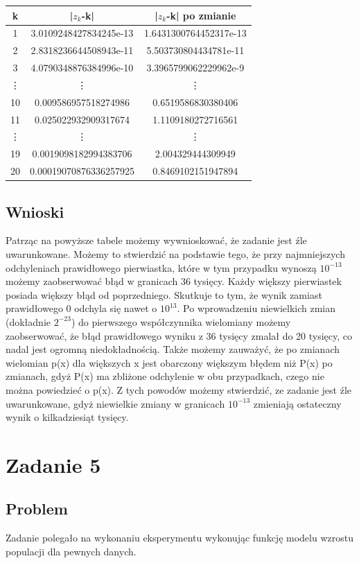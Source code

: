 \documentclass{article}
\begin{document}
\begin{center}
  \begin{tabular}{c|c|c}
    k & |$z_{k}$-k| & |$z_{k}$-k| po zmianie\\
    \hline
    1 & 3.0109248427834245e-13 & 1.6431300764452317e-13\\
    2 & 2.8318236644508943e-11 & 5.503730804434781e-11\\
    3 & 4.0790348876384996e-10 & 3.3965799062229962e-9\\
    \vdots \qquad & \vdots \qquad & \vdots \qquad \\
    10 & 0.009586957518274986 & 0.6519586830380406\\
    11 & 0.025022932909317674 & 1.1109180272716561\\
    \vdots \qquad & \vdots \qquad & \vdots \qquad \\
    19 & 0.0019098182994383706 & 2.004329444309949\\
    20 & 0.00019070876336257925 & 0.8469102151947894
  \end{tabular}
\end{center}
\subsection{Wnioski}
Patrząc na powyższe tabele możemy wywnioskować, że zadanie jest źle uwarunkowane. Możemy to stwierdzić na podstawie tego, że przy najmniejszych odchyleniach prawidłowego pierwiastka, które w tym przypadku wynoszą $10^{-13}$ możemy zaobserwować błąd w granicach 36 tysięcy. Każdy większy pierwiastek posiada większy błąd od poprzedniego. Skutkuje to tym, że wynik zamiast prawidłowego 0 odchyla się nawet o $10^{13}$. Po wprowadzeniu niewielkich zmian (dokładnie $2^{-23}$) do pierwszego współczynnika wielomiany możemy zaobserwować, że błąd prawidłowego wyniku z 36 tysięcy zmalał do 20 tysięcy, co nadal jest ogromną niedokładnością. Także możemy zauważyć, że po zmianach wielomian p(x) dla większych x jest obarczony większym błędem niż P(x) po zmianach, gdyż P(x) ma zbliżone odchylenie w obu przypadkach, czego nie można powiedzieć o p(x). Z tych powodów możemy stwierdzić, ze zadanie jest źle uwarunkowane, gdyż niewielkie zmiany w granicach $10^{-13}$ zmieniają ostateczny wynik o kilkadziesiąt tysięcy.



\section{Zadanie 5}
\subsection{Problem}
Zadanie polegało na wykonaniu eksperymentu wykonując funkcję modelu wzrostu populacji dla pewnych danych.
\end{document}
